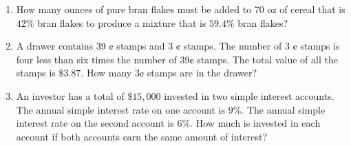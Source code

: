\documentclass{ximera}
\begin{document}
\begin{enumerate}
\item How many ounces of pure bran flakes must be added to 70 oz of cereal that is $42 \%$ bran flakes to produce a mixture that is $59.4 \%$ bran flakes?\\

\item A drawer contains 39 ¢ stamps and 3 ¢ stamps. The number of 3 ¢ stamps is four less than six times the number of 39¢ stamps. The total value of all the stamps is $\$ 3.87$. How many $3 ¢$ stamps are in the drawer?

\item An investor has a total of $\$ 15,000$ invested in two simple interest accounts. The annual simple interest rate on one account is $9 \%$. The annual simple interest rate on the second account is $6 \%$. How much is invested in each account if both accounts earn the same amount of interest?

\end{enumerate}
\end{document}
